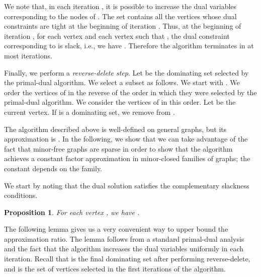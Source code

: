 \documentclass[11pt]{article}
\newtheorem{prop}[lemma]{Proposition}
\begin{document}
We note that, in each iteration , it is possible to increase the
dual variables corresponding to the nodes of . The set  contains all the vertices whose dual constraints are tight at the
beginning of iteration . Thus, at the beginning of iteration ,
for each vertex  and each vertex  such that , the dual constraint corresponding to  is slack,
i.e., we have . Therefore
the algorithm terminates in at most  iterations.

Finally, we perform a \emph{reverse-delete step}. Let  be the
dominating set selected by the primal-dual algorithm. We select a
subset  as follows. We start with . We order the vertices
of  in the reverse of the order in which they were selected by the
primal-dual algorithm. We consider the vertices of  in this order.
Let  be the current vertex. If  is a dominating set, we
remove  from .

The algorithm described above is well-defined on general graphs, but
its approximation is . In the following, we show that we
can take advantage of the fact that minor-free graphs are sparse in
order to show that the algorithm achieves a constant factor
approximation in minor-closed families of graphs; the constant
depends on the family.

We start by noting that the dual solution  satisfies the
complementary slackness conditions.

\begin{prop} \label{prop:complementary-slackness}
	For each vertex , we have .
\end{prop}

\noindent
The following lemma gives us a very convenient way to upper bound the
approximation ratio. The lemma follows from a standard primal-dual
analysis and the fact that the algorithm increases the dual variables
uniformly in each iteration. Recall that  is the final dominating
set after performing reverse-delete, and  is the set of
vertices selected in the first  iterations of the algorithm.
\end{document}

